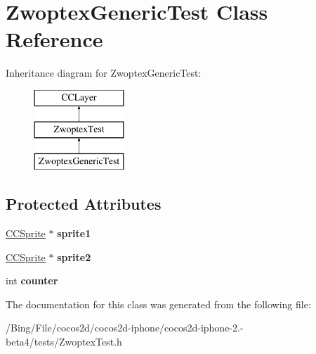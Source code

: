 \hypertarget{interface_zwoptex_generic_test}{\section{Zwoptex\-Generic\-Test Class Reference}
\label{interface_zwoptex_generic_test}
}
Inheritance diagram for Zwoptex\-Generic\-Test\-:\begin{figure}[H]
\begin{center}
\leavevmode
\includegraphics[height=3.000000cm]{interface_zwoptex_generic_test}
\end{center}
\end{figure}
\subsection*{Protected Attributes}
\begin{DoxyCompactItemize}
\item 
\hypertarget{interface_zwoptex_generic_test_a9b64ccf51deabe6353809703cc9582fb}{\hyperlink{class_c_c_sprite}{C\-C\-Sprite} $\ast$ {\bfseries sprite1}}\label{interface_zwoptex_generic_test_a9b64ccf51deabe6353809703cc9582fb}

\item 
\hypertarget{interface_zwoptex_generic_test_abe2fa871539592b2dcd46004e512928b}{\hyperlink{class_c_c_sprite}{C\-C\-Sprite} $\ast$ {\bfseries sprite2}}\label{interface_zwoptex_generic_test_abe2fa871539592b2dcd46004e512928b}

\item 
\hypertarget{interface_zwoptex_generic_test_a885b72f5930e1d44e62b42407d0400db}{int {\bfseries counter}}\label{interface_zwoptex_generic_test_a885b72f5930e1d44e62b42407d0400db}

\end{DoxyCompactItemize}


The documentation for this class was generated from the following file\-:\begin{DoxyCompactItemize}
\item 
/\-Bing/\-File/cocos2d/cocos2d-\/iphone/cocos2d-\/iphone-\/2.-\/beta4/tests/Zwoptex\-Test.\-h\end{DoxyCompactItemize}
